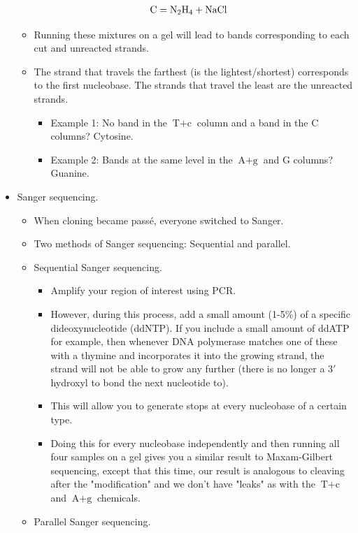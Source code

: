 \documentclass[../notes.tex]{subfiles}
\begin{document}
\begin{itemize}
\begin{itemize}
\begin{align*}
            \text{C} &= \ce{N2H4 + NaCl}
        \end{align*}
        \item Running these mixtures on a gel will lead to bands corresponding to each cut and unreacted strands.
        \item The strand that travels the farthest (is the lightest/shortest) corresponds to the first nucleobase. The strands that travel the least are the unreacted strands.
        \begin{itemize}
            \item Example 1: No band in the $\text{T}+\text{c}$ column and a band in the $\text{C}$ columns? Cytosine.
            \item Example 2: Bands at the same level in the $\text{A}+\text{g}$ and $\text{G}$ columns? Guanine.
        \end{itemize}
    \end{itemize}
    \item Sanger sequencing.
    \begin{itemize}
        \item When cloning became pass\'{e}, everyone switched to Sanger.
        \item Two methods of Sanger sequencing: Sequential and parallel.
        \item Sequential Sanger sequencing.
        \begin{itemize}
            \item Amplify your region of interest using PCR.
            \item However, during this process, add a small amount (1-5\%) of a specific dideoxynucleotide (ddNTP). If you include a small amount of ddATP for example, then whenever DNA polymerase matches one of these with a thymine and incorporates it into the growing strand, the strand will not be able to grow any further (there is no longer a $3'$ hydroxyl to bond the next nucleotide to).
            \item This will allow you to generate stops at every nucleobase of a certain type.
            \item Doing this for every nucleobase independently and then running all four samples on a gel gives you a similar result to Maxam-Gilbert sequencing, except that this time, our result is analogous to cleaving after the "modification" and we don't have "leaks" as with the $\text{T}+\text{c}$ and $\text{A}+\text{g}$ chemicals.
        \end{itemize}
        \item Parallel Sanger sequencing.

\end{itemize}
\end{itemize}
\end{document}
